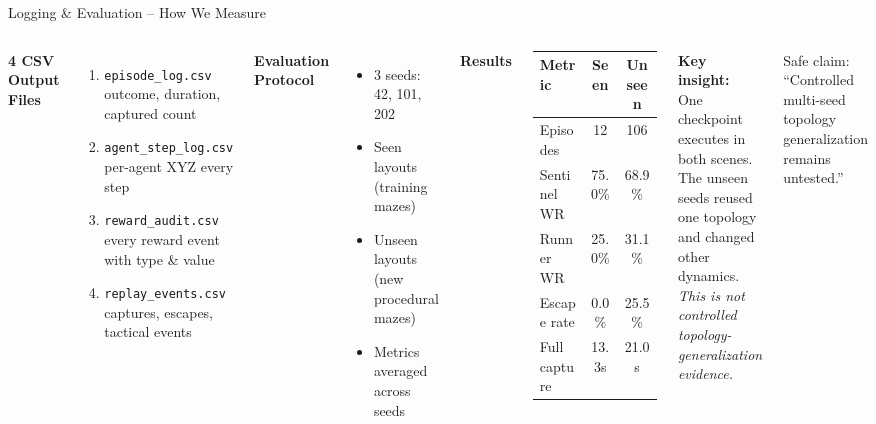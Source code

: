 \documentclass[aspectratio=169,11pt]{beamer}
\begin{document}
\begin{frame}{Logging \& Evaluation -- How We Measure}
\begin{columns}[T]
\textbf{4 CSV Output Files}
\begin{enumerate}
\item \texttt{episode\_log.csv}\\
{\scriptsize outcome, duration, captured count}
\item \texttt{agent\_step\_log.csv}\\
{\scriptsize per-agent XYZ every step}
\item \texttt{reward\_audit.csv}\\
{\scriptsize every reward event with type \& value}
\item \texttt{replay\_events.csv}\\
{\scriptsize captures, escapes, tactical events}
\end{enumerate}

\vspace{6pt}
\textbf{Evaluation Protocol}
\begin{itemize}
\item 3 seeds: 42, 101, 202
\item Seen layouts (training mazes)
\item Unseen layouts (new procedural mazes)
\item Metrics averaged across seeds
\end{itemize}

\textbf{Results}
\begin{tabular}{@{}lcc@{}}
\toprule
Metric & Seen & Unseen \\
\midrule
Episodes & 12 & 106 \\
Sentinel WR & 75.0\% & 68.9\% \\
Runner WR & 25.0\% & 31.1\% \\
Escape rate & 0.0\% & 25.5\% \\
Full capture & 13.3s & 21.0s \\
\bottomrule
\end{tabular}

\vspace{6pt}
\textbf{Key insight:}\\
One checkpoint executes in both scenes.\\
The unseen seeds reused one topology and changed other dynamics.\\
\textit{This is not controlled topology-generalization evidence.}

\vspace{4pt}
{\small Safe claim: ``Controlled multi-seed topology generalization remains untested.''}
\end{columns}
\end{frame}
\end{document}
